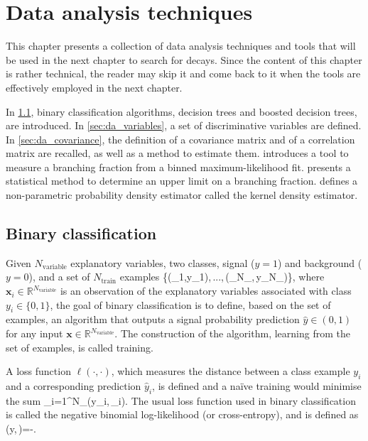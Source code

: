 \chapter{Data analysis techniques} \label{ch:data_analysis}
This chapter presents a collection of data analysis techniques and tools that will be used in the next chapter to search for \BKnn decays.
Since the content of this chapter is rather technical, the reader may skip it and come back to it when the tools are effectively employed in the next chapter.

In \cref{sec:da_binary_cls}, binary classification algorithms, decision trees and boosted decision trees, are introduced.
In \cref{sec:da_variables}, a set of discriminative variables are defined.
In \cref{sec:da_covariance}, the definition of a covariance matrix and of a correlation matrix are recalled, as well as a method to estimate them.
 introduces a tool to measure a branching fraction from a binned maximum-likelihood fit.
 presents a statistical method to determine an upper limit on a branching fraction.
 defines a non-parametric probability density estimator called the kernel density estimator.
\section{Binary classification} \label{sec:da_binary_cls}
Given $N_{\mathrm{variable}}$ explanatory variables, two classes, signal ($y=1$) and background ($y=0$), and a set of $N_{\mathrm{train}}$ examples
\be
\{(_1,y_1),\,...,\,(_{N_{}},\,y_{N_{}})\},
\ee
where $\mathbf{x}_i\in\mathbb{R}^{N_{\mathrm{variable}}}$ is an observation of the explanatory variables associated with class $y_i\in\{0,1\}$, the goal of binary classification is to define, based on the set of examples, an algorithm that outputs a signal probability prediction $\hat{y}\in(0,1)$ for any input $\mathbf{x}\in\mathbb{R}^{N_{\mathrm{variable}}}$.
The construction of the algorithm, learning from the set of examples, is called training.

A loss function $\ell(\cdot,\cdot)$, which measures the distance between a class example $y_i$ and a corresponding prediction $\hat{y}_i$, is defined and a na\"ive training would minimise the sum
\be
\sum_{i=1}^{N_{}}\ell\left(y_i,\,_i\right).
\ee
The usual loss function used in binary classification is called the negative binomial log-likelihood (or cross-entropy), and is defined as \cite{hastie01statisticallearning}
\be \label{eq:loss}
\ell\left(y,\,\right)=-.
\ee


